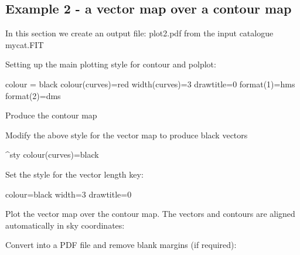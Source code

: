 \subsection{ Example 2 - a vector map over a contour map}
\label{section:kappa-example2}


In this section we create an output file: plot2.pdf from the input
catalogue mycat.FIT

\begin{terminalv}
\end{terminalv}

Setting up the main plotting style for contour and polplot:

\begin{terminalv}
colour = black
colour(curves)=red
width(curves)=3
drawtitle=0
format(1)=hms
format(2)=dms
\end{terminalv}


Produce the contour map

\begin{terminalv}
\end{terminalv}


Modify the above style for the vector map to produce black vectors

\begin{terminalv}
^sty
colour(curves)=black
\end{terminalv}


Set the style for the vector length key:


\begin{terminalv}
colour=black
width=3
drawtitle=0
\end{terminalv}

Plot the vector map over the contour map. The vectors and contours are
aligned automatically in sky coordinates:


\begin{terminalv}
\end{terminalv}

Convert into a PDF file and remove blank margins (if required):

\begin{terminalv}
\end{terminalv}

